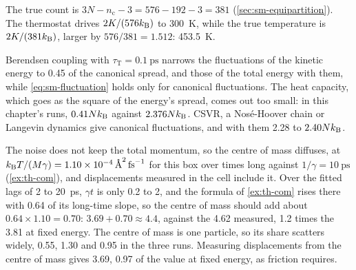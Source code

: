 The true count is $3N - n_{\mathrm c} - 3 = 576 -
192 - 3 = 381$ (\cref{sec:sm-equipartition}). The thermostat drives
$2K/(576k_{\mathrm{B}})$ to \SI{300}{\kelvin}, while the true temperature is
$2K/(381k_{\mathrm{B}})$, larger by $576/381 = 1.512$: \SI{453.5}{\kelvin}.

Berendsen coupling with $\tau_{\mathrm T} =
\SI{0.1}{\pico\second}$ narrows the fluctuations of the kinetic energy
to 0.45 of the canonical spread, and those of the total energy with them,
while \cref{eq:sm-fluctuation} holds only for canonical fluctuations. The
heat capacity, which goes as the square of the energy's spread, comes out
too small: in this chapter's runs, $0.41Nk_{\mathrm{B}}$ against $2.376Nk_{\mathrm{B}}$. CSVR, a
Nosé-Hoover chain or Langevin dynamics give canonical fluctuations, and
with them 2.28 to $2.40Nk_{\mathrm{B}}$.

The noise does not keep the total momentum, so
the centre of mass diffuses, at $\kB T/(M\gamma) =
\SI{1.10e-4}{\angstrom\squared\per\femto\second}$ for this box over times
long against $1/\gamma = \SI{10}{\pico\second}$ (\cref{ex:th-com}), and
displacements measured in the cell include it. Over the fitted lags of 2
to \SI{20}{\pico\second}, $\gamma t$ is only 0.2 to 2, and the formula of
\cref{ex:th-com} rises there with 0.64 of its long-time slope, so the
centre of mass should add about $0.64\times1.10 = 0.70$: $3.69 + 0.70
\approx 4.4$, against the 4.62 measured, 1.2 times the 3.81 at fixed
energy. The centre of mass is one particle, so its share scatters widely,
0.55, 1.30 and 0.95 in the three runs. Measuring displacements from the
centre of mass gives 3.69, 0.97 of the value at fixed energy, as friction
requires.
